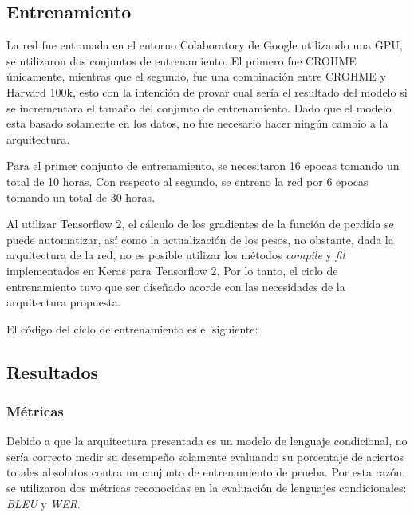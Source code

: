



\subsection{Entrenamiento}

La red fue entranada en el entorno Colaboratory de Google utilizando una GPU, se utilizaron dos conjuntos de entrenamiento. El primero fue CROHME únicamente, mientras que el segundo, fue una combinación entre CROHME y Harvard 100k, esto con la intención de provar cual sería el resultado del modelo si se incrementara el tamaño del conjunto de entrenamiento. Dado que el modelo esta basado solamente en los datos, no fue necesario hacer ningún cambio a la arquitectura.

Para el primer conjunto de entrenamiento, se necesitaron 16 epocas tomando un total de 10 horas. Con respecto al segundo, se entreno la red por 6 epocas tomando un total de 30 horas.

Al utilizar Tensorflow 2, el cálculo de los gradientes de la función de perdida se puede automatizar, así como la actualización de los pesos, no obstante, dada la arquitectura de la red, no es posible utilizar los métodos \textit{compile} y \textit{fit} implementados en Keras para Tensorflow 2. Por lo tanto, el ciclo de entrenamiento tuvo que ser diseñado acorde con las necesidades de la arquitectura propuesta.

El código del ciclo de entrenamiento es el siguiente:



\subsection{Resultados}

\subsubsection{Métricas}

Debido a que la arquitectura presentada es un modelo de lenguaje condicional, no sería correcto medir su desempeño solamente evaluando su porcentaje de aciertos totales absolutos contra un conjunto de entrenamiento de prueba. Por esta razón, se utilizaron dos métricas reconocidas en la evaluación de lenguajes condicionales: \textit{BLEU} y \textit{WER}.

